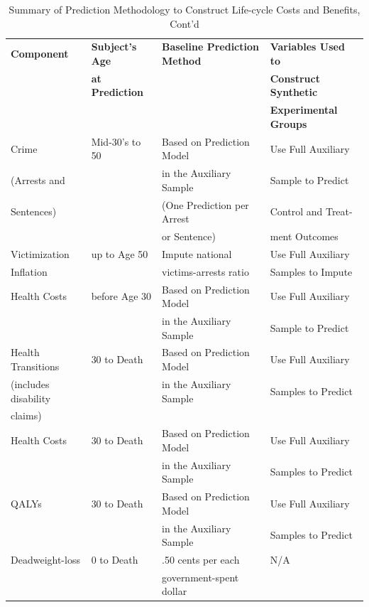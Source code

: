 \documentclass[static]{JJH-Beamer}
\begin{document}
\begin{frame}
 \addtocounter{framenumber}{-1}

\begin{table}[H]
\addtocounter{table}{-1}
\caption{Summary of Prediction Methodology to Construct Life-cycle Costs and Benefits, Cont'd}\label{table:sources}
\begin{center}
\begin{tabular}{llll}
\toprule
\textbf{Component} & \textbf{Subject's Age} & \textbf{Baseline Prediction Method} & \textbf{Variables Used to} \\
&   \textbf{at Prediction} &     & \textbf{Construct Synthetic} \\
&   &   & \textbf{Experimental Groups}\\
\midrule
Crime        & Mid-30's to 50  & Based on Prediction Model   & Use Full Auxiliary   \\
(Arrests and &      & in the Auxiliary Sample  & Sample  to Predict  \\
 Sentences)  &      & (One Prediction per Arrest  & Control and Treat- \\
             &      & or Sentence)   & ment Outcomes \\
\midrule
Victimization  & up to Age 50  &  Impute national   & Use Full Auxiliary \\
Inflation      &   &  victims-arrests ratio   & Samples to Impute   \\
\midrule
Health Costs  & before Age 30 & Based on Prediction Model & Use Full Auxiliary   \\
            &    & in the Auxiliary Sample  & Sample  to Predict  \\
\midrule
Health Transitions   & 30 to Death & Based on Prediction Model & Use Full Auxiliary    \\
(includes disability   &    & in the Auxiliary Sample  & Samples to Predict \\
claims)    &    &    &   \\
\midrule
Health Costs  & 30 to Death  & Based on Prediction Model & Use Full Auxiliary  \\
              &   & in the Auxiliary Sample  & Samples to Predict \\
\midrule
QALYs    & 30 to Death  & Based on Prediction Model & Use Full Auxiliary  \\
         &   & in the Auxiliary Sample  & Samples to Predict \\
\midrule
Deadweight-loss   & 0 to Death   &  .50 cents per each  &  N/A \\
           &   & government-spent dollar  & \\
\bottomrule
\end{tabular}
\end{center}
\end{table}


\end{frame}
\end{document}
